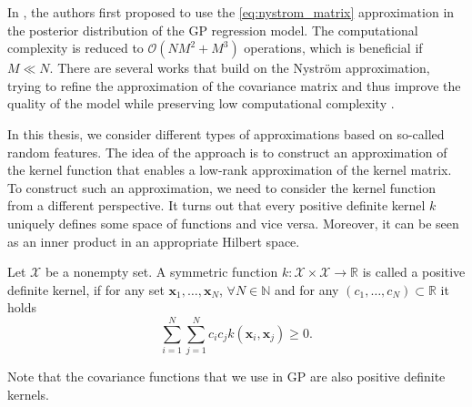 In \citep{williams2001using}, the authors first proposed to use the
\eqref{eq:nystrom_matrix} approximation in the posterior distribution of the GP regression model.
The computational complexity is reduced to $\mathcal{O}(NM^2 + M^3)$ operations,
which is beneficial if $M \ll N$.
There are several works that build on the Nystr{\"o}m approximation, trying to refine
the approximation of the covariance matrix and thus improve the quality of the model
while preserving low computational complexity \citep{quinonero2005unifying, rossi2020sparse}.

In this thesis, we consider different types of approximations based on so-called
random features.
The idea of the approach is to construct an approximation of the kernel function
that enables a low-rank approximation of the kernel matrix.
To construct such an approximation, we need to consider the kernel function from a different
perspective.
It turns out that every positive definite kernel $k$ uniquely defines some space of functions
and vice versa.
Moreover, it can be seen as an inner product in an appropriate Hilbert space.

\begin{definition}
    Let $\mathcal{X}$ be a nonempty set.
    A symmetric function $k \colon \mathcal{X} \times \mathcal{X} \rightarrow \mathbb{R}$
    is called a positive definite kernel, if for any set $\mathbf{x}_1, \ldots, \mathbf{x}_N$,
    $\forall N \in \mathbb{N}$ and for any $(c_1, \ldots, c_N)\subset \mathbb{R}$ it holds
    \[
        \sum_{i=1}^N \sum_{j=1}^N c_i c_j k(\mathbf{x}_i, \mathbf{x}_j) \geq 0.
    \]
\end{definition}

Note that the covariance functions that we use in GP are also positive definite kernels.

